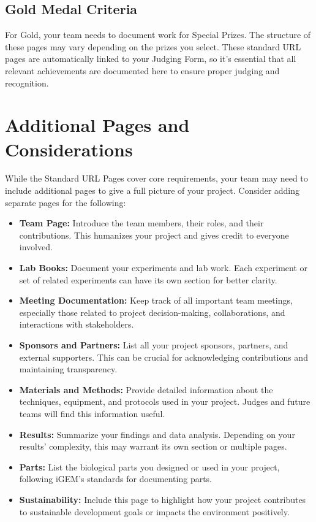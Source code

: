 \subsection*{Gold Medal Criteria} 
For Gold, your team needs to document work for Special Prizes.
The structure of these pages may vary depending on the prizes you select. \newline
These standard URL pages are automatically linked to your Judging Form, so it’s essential that all relevant achievements are documented here to ensure proper judging and recognition.

\section{Additional Pages and Considerations}

While the Standard URL Pages cover core requirements, your team may need to include additional pages to give a full picture of your project.
Consider adding separate pages for the following:

\begin{itemize}
\item \textbf{Team Page:} Introduce the team members, their roles, and their contributions.
This humanizes your project and gives credit to everyone involved.

\item \textbf{Lab Books:} Document your experiments and lab work.
Each experiment or set of related experiments can have its own section for better clarity.

\item \textbf{Meeting Documentation:} Keep track of all important team meetings, especially those related to project decision-making, collaborations, and interactions with stakeholders.

\item \textbf{Sponsors and Partners:} List all your project sponsors, partners, and external supporters.
This can be crucial for acknowledging contributions and maintaining transparency.

\item \textbf{Materials and Methods:} Provide detailed information about the techniques, equipment, and protocols used in your project.
Judges and future teams will find this information useful.

\item \textbf{Results:} Summarize your findings and data analysis.
Depending on your results' complexity, this may warrant its own section or multiple pages.

\item \textbf{Parts:} List the biological parts you designed or used in your project, following iGEM’s standards for documenting parts.

\item \textbf{Sustainability:} Include this page to highlight how your project contributes to sustainable development goals or impacts the environment positively.
\end{itemize}

